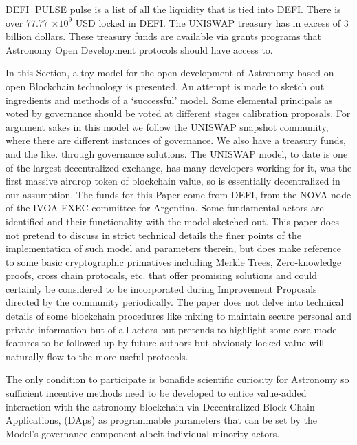 \documentclass[final,5p,times,twocolumn,authoryear]{elsarticle}
\begin{document}
\href{https://defipulse.com/}{DEFI$\;$ PULSE} pulse is a list of all the liquidity that is tied into DEFI. There is over 77.77 $\times 10^{9}$ USD locked in DEFI. The UNISWAP treasury has in excess of 3 billion dollars. These treasury funds are available via grants programs that Astronomy Open Development protocols should have access to.

In this Section, a toy model for the open development of Astronomy based on open Blockchain technology is presented. An attempt is made to sketch out ingredients and methods of a `successful' model. Some elemental principals as voted by governance should be voted at different stages calibration proposals. For argument sakes in this model we follow the UNISWAP snapshot community, where there are different instances of governance. We also have a treasury funds, and the like.  through governance solutions. The UNISWAP model, to date is one of the largest decentralized exchange, has many developers working for it, was the first massive airdrop token of blockchain value, so is essentially decentralized in our assumption. The funds for this Paper come from DEFI, from the NOVA node of the IVOA-EXEC committee for Argentina. Some fundamental actors are identified and their functionality with the model sketched out. This paper does not pretend to discuss in strict technical details the finer points of the implementation of such model and parameters therein, but does make reference to some basic cryptographic primatives including Merkle Trees, Zero-knowledge proofs, cross chain protocals, etc. that offer promising solutions and could certainly be considered to be incorporated during Improvement Proposals directed by the community periodically. The paper does not delve into technical details of some blockchain procedures like mixing to maintain secure personal and private information but of all actors but pretends to highlight some core model features to be followed up by future authors but obviously  locked value will naturally flow to the more useful protocols.  
 
The only condition to participate is bonafide scientific curiosity for Astronomy so sufficient incentive methods need to be developed to entice value-added interaction with the astronomy blockchain via Decentralized Block Chain Applications, (DAps) as programmable parameters that can be set by the Model's governance component albeit individual minority actors. 
\end{document}
